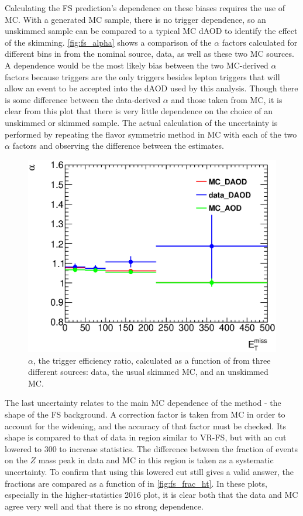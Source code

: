 Calculating the \ac{FS} prediction's dependence on these biases requires the use of \ac{MC}. With a generated \ac{MC} sample, there is no trigger dependence, so an unskimmed sample can be compared to a typical \ac{MC} dAOD to identify the effect of the skimming. \autoref{fig:fs_alpha} shows a comparison of the $\alpha$ factors calculated for different bins in \met from the nominal source, data, as well as these two \ac{MC} sources. A \met dependence would be the most likely bias between the two \ac{MC}-derived $\alpha$ factors because \met triggers are the only triggers besides lepton triggers that will allow an event to be accepted into the dAOD used by this analysis. Though there is some difference between the data-derived $\alpha$ and those taken from \ac{MC}, it is clear from this plot that there is very little dependence on the choice of an unskimmed or skimmed sample. The actual calculation of the uncertainty is performed by repeating the flavor symmetric method in \ac{MC} with each of the two $\alpha$ factors and observing the difference between the estimates.

\begin{centering}
\begin{figure}[bth]
\myfloatalign
\includegraphics[width=.85\linewidth]{figures/fs/trigger_ratios.eps}
\caption{$\alpha$, the trigger efficiency ratio, calculated as a function of \met from three different sources: data, the usual skimmed \ttbar \ac{MC}, and an unskimmed \ttbar \ac{MC}.}
\label{fig:fs_alpha}
\end{figure}
\end{centering}

The last uncertainty relates to the main \ac{MC} dependence of the method - the \mll shape of the \ac{FS} background. A correction factor is taken from \ac{MC} in order to account for the \mll widening, and the accuracy of that factor must be checked. Its shape is compared to that of data in region similar to VR-FS, but with an \HT cut lowered to 300 \gev to increase statistics. The difference between the fraction of events on the $Z$ mass peak in data and \ac{MC} in this region is taken as a systematic uncertainty. To confirm that using this lowered \HT cut still gives a valid answer, the fractions are compared as a function of \HT in \autoref{fig:fs_frac_ht}. In these plots, especially in the higher-statistics 2016 plot, it is clear both that the data and \ac{MC} agree very well and that there is no strong \HT dependence. 

